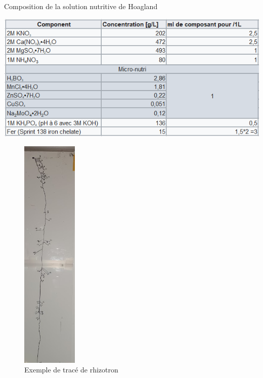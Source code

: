 \newpage

\label{an:Hoagland}
\begin{table}[ht]
\centering
\caption{Composition de la solution nutritive de Hoagland}
\includegraphics[width=1\textwidth]{Image/hoagland.png}
\end{table}

\newpage

\label{an:trace}
\begin{figure}[ht]
\centering
\includegraphics[width=0.235\textwidth]{Image/trace.png}
\caption{Exemple de tracé de rhizotron}
\end{figure}

\newpage


